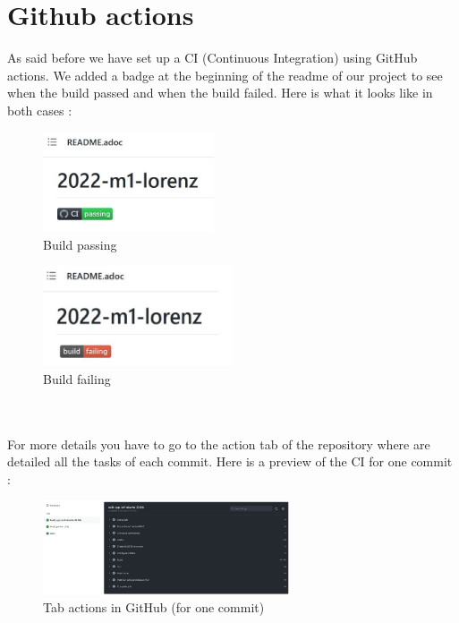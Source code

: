 \newpage

\section{Github actions}
\label{ci}

	As said before we have set up a CI (Continuous Integration) using GitHub actions.
	We added a badge at the beginning of the readme of our project to see when the build passed and when the build failed. Here is what it looks like in both cases : \\
	\begin{minipage}{0.48\linewidth}
		\begin{figure}[H]
			\centering
			\includegraphics[width=0.45\textwidth]{"images/appendix/badge_ok.jpg"}
			\caption{Build passing}
			\label{badge_ok}
		\end{figure}
	\end{minipage}
	\begin{minipage}{0.48\linewidth}
		\begin{figure}[H]
			\centering
			\includegraphics[width=0.5\textwidth]{"images/appendix/badge_not_ok.jpg"}
			\caption{Build failing}
			\label{badge_not_ok}
		\end{figure}
	\end{minipage} \\ \; \\
	For more details you have to go to the action tab of the repository where are detailed all the tasks of each commit. Here is a preview of the CI for one commit :
	\begin{figure}[H]
		\centering
		\includegraphics[width=0.65\textwidth]{"images/appendix/run_ci.jpg"}
		\caption{Tab actions in GitHub (for one commit)}
		\label{run_ci}
	\end{figure}
